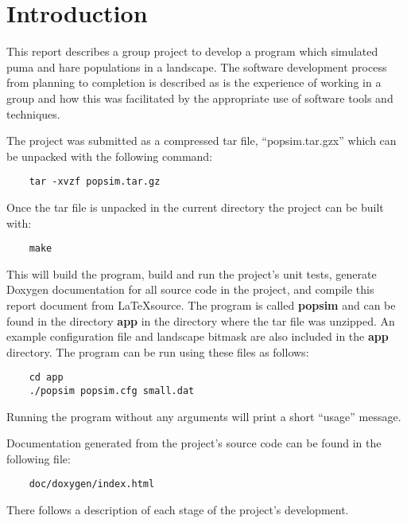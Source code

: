 \section{Introduction}
\label{Introduction}
This report describes a group project to develop a program which simulated puma and hare populations in a landscape.  
The software development process from planning to completion is described as is the experience of working in a group and how this was facilitated by the appropriate use of software tools and techniques.

The project was submitted as a compressed tar file, ``popsim.tar.gzx'' which can be unpacked with the following command:

\begin{lstlisting}
	tar -xvzf popsim.tar.gz
\end{lstlisting}

Once the tar file is unpacked in the current directory the project can be built with:

\begin{lstlisting}
	make
\end{lstlisting}

This will build the program, build and run the project's unit tests, generate Doxygen documentation for all source code in the project, and compile this report document from \LaTeX source.  The program is called \textbf{popsim} and can be found in the directory \textbf{app} in the directory where the tar file was unzipped.  An example configuration file and landscape bitmask are also included in the \textbf{app} directory.  The program can be run using these files as follows:
   

\begin{lstlisting}
	cd app
	./popsim popsim.cfg small.dat
\end{lstlisting}

Running the program without any arguments will print a short ``usage'' message.

Documentation generated from the project's source code can be found in the following file:

\begin{lstlisting}
	doc/doxygen/index.html
\end{lstlisting}

There follows a description of each stage of the project's development.
